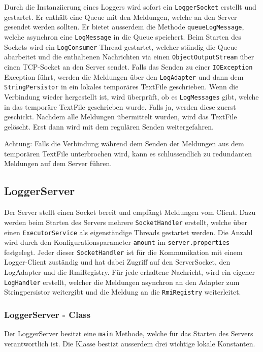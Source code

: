 \documentclass[12pt,a4paper,twosided]{scrartcl}
\begin{document}
Durch die Instanziierung eines Loggers wird sofort ein \texttt{LoggerSocket} erstellt und gestartet. Er enthält eine Queue mit den Meldungen, welche an den Server gesendet werden sollten. Er bietet ausserdem die Methode \texttt{queueLogMessage}, welche asynchron eine \texttt{LogMessage} in die Queue speichert. Beim Starten des Sockets wird ein \texttt{LogConsumer}-Thread gestartet, welcher ständig die Queue abarbeitet und die enthaltenen Nachrichten via einen \texttt{ObjectOutputStream} über einen TCP-Socket an den Server sendet. Falls das Senden zu einer \texttt{IOException} Exception führt, werden die Meldungen über den \texttt{LogAdapter} und dann dem \texttt{StringPersistor} in ein lokales temporäres TextFile geschrieben. Wenn die Verbindung wieder hergestellt ist, wird überprüft, ob es \texttt{LogMessages} gibt, welche in das temporäre TextFile geschrieben wurde. Falls ja, werden diese zuerst geschickt. Nachdem alle Meldungen übermittelt wurden, wird das TextFile gelöscht. Erst dann wird mit dem regulären Senden weitergefahren.

Achtung: Falls die Verbindung während dem Senden der Meldungen aus dem temporären TextFile unterbrochen wird, kann es schlussendlich zu redundanten Meldungen auf dem Server führen.

\subsection{LoggerServer}
Der Server stellt einen Socket bereit und empfängt Meldungen vom Client. Dazu werden beim Starten des Servers mehrere \texttt{SocketHandler} erstellt, welche über einen \texttt{ExecutorService} als eigenständige Threads gestartet werden. Die Anzahl wird durch den Konfigurationsparameter \texttt{amount} im \texttt{server.properties} festgelegt. Jeder dieser \texttt{SocketHandler} ist für die Kommunikation mit einem Logger-Client zuständig und hat dabei Zugriff auf den ServerSocket, den LogAdapter und die RmiRegistry. Für jede erhaltene Nachricht, wird ein eigener \texttt{LogHandler} erstellt, welcher die Meldungen asynchron an den Adapter zum Stringpersistor weitergibt und die Meldung an die \texttt{RmiRegistry} weiterleitet.

\subsubsection{LoggerServer - Class}
Der LoggerServer besitzt eine \texttt{main} Methode, welche für das Starten des Servers verantwortlich ist. Die Klasse bestizt ausserdem drei wichtige lokale Konstanten.
\end{document}
